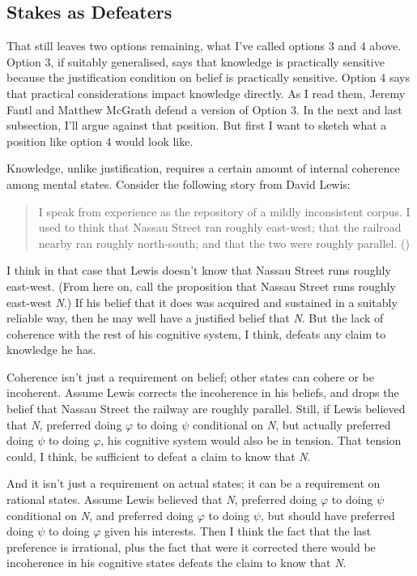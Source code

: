 \documentclass[
  11pt,
  letterpaper,
  DIV=11,
  numbers=noendperiod,
  twoside]{scrartcl}
\begin{document}
\subsection{Stakes as Defeaters}\label{stakes-as-defeaters}

That still leaves two options remaining, what I've called options 3 and
4 above. Option 3, if suitably generalised, says that knowledge is
practically sensitive because the justification condition on belief is
practically sensitive. Option 4 says that practical considerations
impact knowledge directly. As I read them, Jeremy Fantl and Matthew
McGrath defend a version of Option 3. In the next and last subsection,
I'll argue against that position. But first I want to sketch what a
position like option 4 would look like.

Knowledge, unlike justification, requires a certain amount of internal
coherence among mental states. Consider the following story from David
Lewis:

\begin{quote}
I speak from experience as the repository of a mildly inconsistent
corpus. I used to think that Nassau Street ran roughly east-west; that
the railroad nearby ran roughly north-south; and that the two were
roughly parallel. ()
\end{quote}

I think in that case that Lewis doesn't know that Nassau Street runs
roughly east-west. (From here on, call the proposition that Nassau
Street runs roughly east-west \emph{N}.) If his belief that it does was
acquired and sustained in a suitably reliable way, then he may well have
a justified belief that \emph{N}. But the lack of coherence with the
rest of his cognitive system, I think, defeats any claim to knowledge he
has.

Coherence isn't just a requirement on belief; other states can cohere or
be incoherent. Assume Lewis corrects the incoherence in his beliefs, and
drops the belief that Nassau Street the railway are roughly parallel.
Still, if Lewis believed that \emph{N}, preferred doing \(\varphi\) to
doing \(\psi\) conditional on \emph{N}, but actually preferred doing
\(\psi\) to doing \(\varphi\), his cognitive system would also be in
tension. That tension could, I think, be sufficient to defeat a claim to
know that \emph{N}.

And it isn't just a requirement on actual states; it can be a
requirement on rational states. Assume Lewis believed that \emph{N},
preferred doing \(\varphi\) to doing \(\psi\) conditional on \emph{N},
and preferred doing \(\varphi\) to doing \(\psi\), but should have
preferred doing \(\psi\) to doing \(\varphi\) given his interests. Then
I think the fact that the last preference is irrational, plus the fact
that were it corrected there would be incoherence in his cognitive
states defeats the claim to know that \emph{N}.
\end{document}
